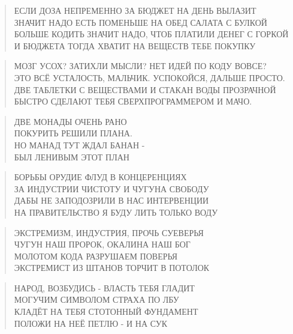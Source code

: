 \poemtitle{***}
\begin{verse}
ЕСЛИ ДОЗА НЕПРЕМЕННО ЗА БЮДЖЕТ НА ДЕНЬ ВЫЛАЗИТ\\
ЗНАЧИТ НАДО ЕСТЬ ПОМЕНЬШЕ НА ОБЕД САЛАТА С БУЛКОЙ\\
БОЛЬШЕ КОДИТЬ ЗНАЧИТ  НАДО, ЧТОБ ПЛАТИЛИ ДЕНЕГ С ГОРКОЙ\\
И БЮДЖЕТА ТОГДА ХВАТИТ НА ВЕЩЕСТВ ТЕБЕ ПОКУПКУ
\end{verse}

\poemtitle{***}
\begin{verse}
МОЗГ УСОХ? ЗАТИХЛИ МЫСЛИ? НЕТ ИДЕЙ ПО КОДУ ВОВСЕ?\\
ЭТО ВСЁ УСТАЛОСТЬ, МАЛЬЧИК. УСПОКОЙСЯ, ДАЛЬШЕ ПРОСТО.\\
ДВЕ ТАБЛЕТКИ С ВЕЩЕСТВАМИ И СТАКАН ВОДЫ ПРОЗРАЧНОЙ\\
БЫСТРО СДЕЛАЮТ ТЕБЯ СВЕРХПРОГРАММЕРОМ И МАЧО.
\end{verse}

\poemtitle{***}
\begin{verse}
ДВЕ МОНАДЫ ОЧЕНЬ РАНО\\
ПОКУРИТЬ РЕШИЛИ ПЛАНА.\\
НО МАНАД ТУТ ЖДАЛ БАНАН - \\
БЫЛ ЛЕНИВЫМ ЭТОТ ПЛАН
\end{verse}

\poemtitle{***}
\begin{verse}
БОРЬБЫ ОРУДИЕ ФЛУД В КОНЦЕРЕНЦИЯХ\\
ЗА ИНДУСТРИИ ЧИСТОТУ И ЧУГУНА СВОБОДУ\\
ДАБЫ НЕ ЗАПОДОЗРИЛИ В НАС ИНТЕРВЕНЦИИ\\
НА ПРАВИТЕЛЬСТВО Я БУДУ ЛИТЬ ТОЛЬКО ВОДУ
\end{verse}

\poemtitle{***}
\begin{verse}
ЭКСТРЕМИЗМ, ИНДУСТРИЯ, ПРОЧЬ СУЕВЕРЬЯ\\
ЧУГУН НАШ ПРОРОК, ОКАЛИНА НАШ БОГ\\
МОЛОТОМ КОДА РАЗРУШАЕМ ПОВЕРЬЯ\\
ЭКСТРЕМИСТ ИЗ ШТАНОВ ТОРЧИТ В ПОТОЛОК
\end{verse}

\poemtitle{***}
\begin{verse}
НАРОД, ВОЗБУДИСЬ - ВЛАСТЬ ТЕБЯ ГЛАДИТ\\
МОГУЧИМ СИМВОЛОМ СТРАХА ПО ЛБУ\\
КЛАДЁТ НА ТЕБЯ СТОТОННЫЙ ФУНДАМЕНТ\\
ПОЛОЖИ НА НЕЁ ПЕТЛЮ - И НА СУК
\end{verse}

